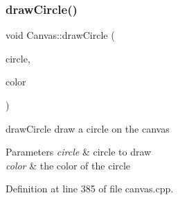 \subsubsection{\texorpdfstring{draw\+Circle()}{drawCircle()}}
{\footnotesize\ttfamily void Canvas\+::draw\+Circle (\begin{DoxyParamCaption}\item[{\hyperlink{class_circle}{Circle}}]{circle,  }\item[{Q\+Color}]{color }\end{DoxyParamCaption})\hspace{0.3cm}{\ttfamily [private]}}



draw\+Circle draw a circle on the canvas 


\begin{DoxyParams}{Parameters}
{\em circle} & circle to draw \\
\hline
{\em color} & the color of the circle \\
\hline
\end{DoxyParams}


Definition at line 385 of file canvas.\+cpp.


